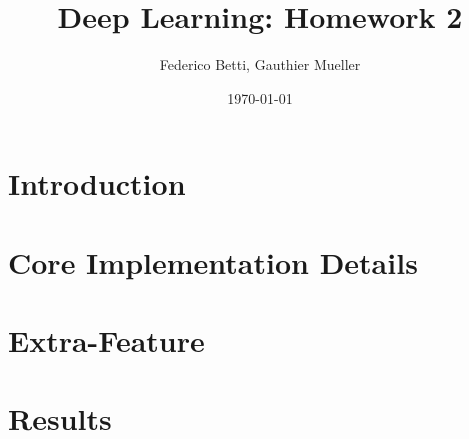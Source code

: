 \documentclass{article}
\title{Deep Learning: Homework 2}
\date{\today}
\author{Federico Betti, Gauthier Mueller}
\begin{document}
\maketitle

\section{Introduction}


\section{Core Implementation Details}


\section{Extra-Feature}


\section{Results}

\end{document}
